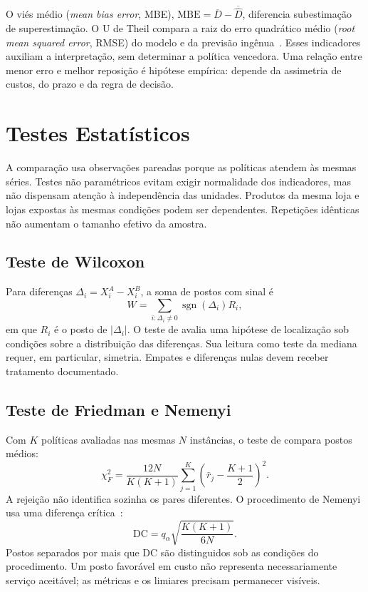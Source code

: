 O viés médio (\textit{mean bias error}, MBE), $\mathrm{MBE}=\overline D-\overline{\hat D}$, diferencia subestimação de superestimação. O U de Theil compara a raiz do erro quadrático médio (\textit{root mean squared error}, RMSE) do modelo e da previsão ingênua~\citep{Theil1966AppliedEconometrics}. Esses indicadores auxiliam a interpretação, sem determinar a política vencedora. Uma relação entre menor erro e melhor reposição é hipótese empírica: depende da assimetria de custos, do prazo e da regra de decisão.

\section{Testes Estatísticos}
\label{sec:stat_tests}

A comparação usa observações pareadas porque as políticas atendem às mesmas séries. Testes não paramétricos evitam exigir normalidade dos indicadores, mas não dispensam atenção à independência das unidades. Produtos da mesma loja e lojas expostas às mesmas condições podem ser dependentes. Repetições idênticas não aumentam o tamanho efetivo da amostra.

\subsection{Teste de Wilcoxon}

Para diferenças $\Delta_i=X_i^A-X_i^B$, a soma de postos com sinal é
\begin{equation}
W=\sum_{i:\Delta_i\neq0}\operatorname{sgn}(\Delta_i)R_i,
\label{eq:wilcoxon}
\end{equation}
em que $R_i$ é o posto de $|\Delta_i|$. O teste de \citet{Wilcoxon1945SignedRank} avalia uma hipótese de localização sob condições sobre a distribuição das diferenças. Sua leitura como teste da mediana requer, em particular, simetria. Empates e diferenças nulas devem receber tratamento documentado.

\subsection{Teste de Friedman e Nemenyi}

Com $K$ políticas avaliadas nas mesmas $N$ instâncias, o teste de \citet{Friedman1940Ranks} compara postos médios:
\begin{equation}
\chi_F^2=\frac{12N}{K(K+1)}\sum_{j=1}^{K}\left(\bar r_j-\frac{K+1}{2}\right)^2.
\label{eq:friedman}
\end{equation}
A rejeição não identifica sozinha os pares diferentes. O procedimento de Nemenyi usa uma diferença crítica~\citep{Nemenyi1963PostHoc}:
\begin{equation}
\mathrm{DC}=q_\alpha\sqrt{\frac{K(K+1)}{6N}}.
\label{eq:cd}
\end{equation}
Postos separados por mais que DC são distinguidos sob as condições do procedimento. Um posto favorável em custo não representa necessariamente serviço aceitável; as métricas e os limiares precisam permanecer visíveis.

